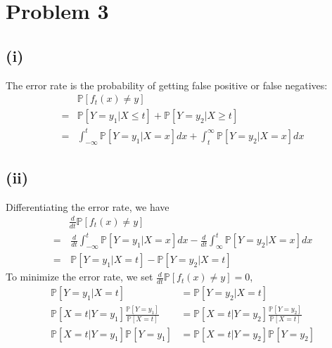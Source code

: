 \documentclass[twoside,11pt]{homework}
\date{02/21/2020}
\begin{document}
\maketitle



\section*{Problem 3} 
\subsection*{(i)}
	The error rate is the probability of getting false positive or false negatives:
	\begin{align*}
		& \mathbb{P}[f_t(x)\neq y] \\
		=& \mathbb{P}[Y=y_1 | X\leq t] + \mathbb{P}[Y=y_2 | X\geq t] \\
		=& \int_{-\infty}^t  \mathbb{P}[Y=y_1 | X=x] dx + \int_{t}^\infty  \mathbb{P}[Y=y_2 | X=x] dx
	\end{align*}
\subsection*{(ii)}
	Differentiating the error rate, we have
	\begin{align*}
		& \frac{d}{dt} \mathbb{P}[f_t(x)\neq y]  \\
		=& \, \frac{d}{dt}\int_{-\infty}^t  \mathbb{P}[Y=y_1 | X=x] dx - \frac{d}{dt} \int_{\infty}^t  \mathbb{P}[Y=y_2 | X=x] dx \\
		=&\,  \mathbb{P}[Y=y_1 | X=t] - \mathbb{P}[Y=y_2 | X=t] \tag{Foundamental Theorem of Calculus}
	\end{align*}
	To minimize the error rate, we set $\frac{d}{dt} \mathbb{P}[f_t(x)\neq y] = 0$,
	\begin{align*}
		\mathbb{P}[Y=y_1 | X=t] &= \mathbb{P}[Y=y_2 | X=t] \\
		\mathbb{P}[ X=t | Y=y_1 ] \frac{ \mathbb{P}[ Y=y_1 ]}{ \mathbb{P}[ X=t]}
		&= \mathbb{P}[ X=t | Y=y_2 ] \frac{ \mathbb{P}[ Y=y_2 ]}{ \mathbb{P}[ X=t]} \tag{Bayes Rule}\\
		\mathbb{P}[ X=t | Y=y_1 ] \mathbb{P}[ Y=y_1 ] 
		&= \mathbb{P}[ X=t | Y=y_2 ] \mathbb{P}[ Y=y_2 ]
	\end{align*}
\end{document}

